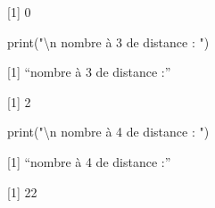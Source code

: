 \documentclass[
]{article}
\newenvironment{Shaded}{\begin{snugshade}}{\end{snugshade}}
\newcommand{\DecValTok}[1]{\textcolor[rgb]{0.00,0.00,0.81}{#1}}
\newcommand{\FunctionTok}[1]{\textcolor[rgb]{0.00,0.00,0.00}{#1}}
\newcommand{\NormalTok}[1]{#1}
\newcommand{\SpecialCharTok}[1]{\textcolor[rgb]{0.00,0.00,0.00}{#1}}
\newcommand{\StringTok}[1]{\textcolor[rgb]{0.31,0.60,0.02}{#1}}
\begin{document}
{[}1{]} 0

\begin{Shaded}
\begin{Highlighting}[]
\FunctionTok{print}\NormalTok{(}\StringTok{"}\SpecialCharTok{\textbackslash{}n}\StringTok{ nombre à 3 de distance : "}\NormalTok{)}
\end{Highlighting}
\end{Shaded}

{[}1{]} ``\n nombre à 3 de distance :''

\begin{Shaded}
\end{Shaded}

{[}1{]} 2

\begin{Shaded}
\begin{Highlighting}[]
\FunctionTok{print}\NormalTok{(}\StringTok{"}\SpecialCharTok{\textbackslash{}n}\StringTok{ nombre à 4 de distance : "}\NormalTok{)}
\end{Highlighting}
\end{Shaded}

{[}1{]} ``\n nombre à 4 de distance :''

\begin{Shaded}
\end{Shaded}

{[}1{]} 22
\end{document}
